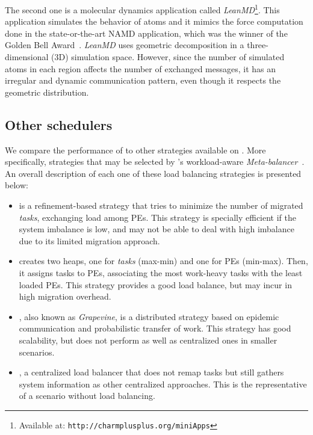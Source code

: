 The second one is a molecular dynamics application called \textit{LeanMD}\footnote{Available at: \texttt{http://charmplusplus.org/miniApps}}.
This application simulates the behavior of atoms and it mimics the force computation done in the state-or-the-art NAMD application, which was the winner of the Golden Bell Award~\cite{namd,namd0}.
\textit{LeanMD} uses geometric decomposition in a three-dimensional ($3$D) simulation space.
However, since the number of simulated atoms in each region affects the number of exchanged messages, it has an irregular and dynamic communication pattern, even though it respects the geometric distribution.

\subsection{Other schedulers}

We compare the performance of \packdrop to other strategies available on \charm.
More specifically, strategies that may be selected by \charm 's workload-aware \textit{Meta-balancer}~\cite{MenonPHD}.
An overall description of each one of these load balancing strategies is presented below:

\begin{itemize}
	\item {} is a refinement-based strategy that tries to minimize the number of migrated \textit{tasks}, exchanging load among PEs.
This strategy is specially efficient if the system imbalance is low, and may not be able to deal with high imbalance due to its limited migration approach.
	\item \greedylb creates two heaps, one for \textit{tasks} (max-min) and one for PEs (min-max). 
Then, it assigns tasks to PEs, associating the most work-heavy tasks with the least loaded PEs.
This strategy provides a good load balance, but may incur in high migration overhead.
    \item \distributedlb, also known as \textit{Grapevine}, is a distributed strategy based on epidemic communication and probabilistic transfer of work.
   This strategy has good scalability, but does not perform as well as centralized ones in smaller scenarios.
   \item \dummylb, a centralized load balancer that does not remap tasks but still gathers system information as other centralized approaches.
   This is the representative of a scenario without load balancing.

\end{itemize}



